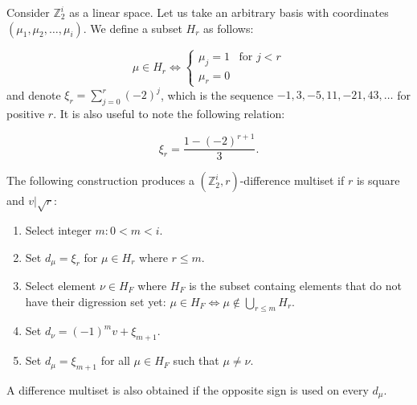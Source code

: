 Consider $\mathbb Z_2^i$ as a linear space. Let us take an arbitrary basis with coordinates $(\mu_1, \mu_2, \ldots, \mu_i)$. We define a subset $H_r$ as follows:

\begin{equation}
    \mu \in H_r \iff 
        \begin{cases}
            \mu_j = 1 & \text{for } j < r \\
            \mu_r = 0
        \end{cases}
\end{equation}
and denote $\xi_r = \sum\limits_{j=0}^r (-2)^j$, which is the sequence $-1,3,-5,11,-21,43,\ldots$ for positive $r$. It is also useful to note the following relation\cite{A077925}:

\begin{equation}
    \label{z2i:eq:xi}
    \xi_r = \frac{1-(-2)^{r+1}}3.
\end{equation}

\begin{theorem}
    \label{z2i:theorem:construction}
    The following construction produces a $(\mathbb Z_2^i, r)$-difference multiset if $r$ is square and $v | \sqrt r$:
    \begin{enumerate}
        \item Select integer $m \colon 0 < m < i$.
        \item Set $d_\mu = \xi_r$ for $\mu \in H_r$ where $r \leq m$.
        \item Select element $\nu \in H_F$ where $H_F$ is the subset containg elements that do not have their digression set yet: $\mu \in H_F \iff \mu \notin \bigcup\limits_{r \leq m} H_r$.
        \item Set $d_\nu = (-1)^m v + \xi_{m+1}$.
        \item Set $d_\mu = \xi_{m+1}$ for all $\mu \in H_F$ such that $\mu \neq \nu$.
    \end{enumerate}
\end{theorem}

A difference multiset is also obtained if the opposite sign is used on every $d_\mu$.


